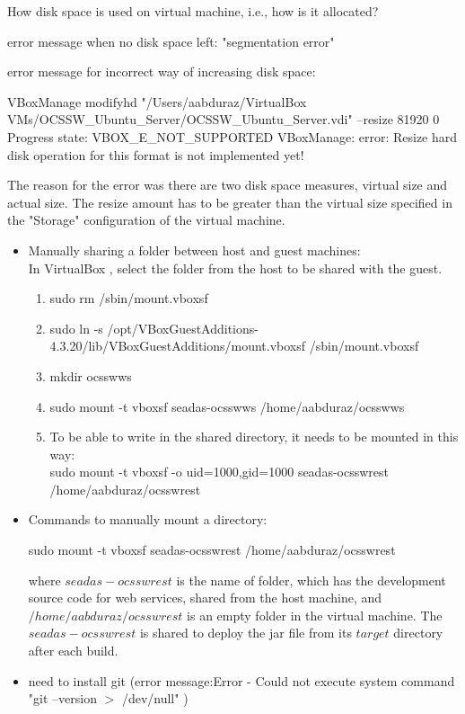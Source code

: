 \documentclass[11pt, oneside]{article}   	%
\begin{document}
How disk space is used on virtual machine, i.e., how is it allocated?

error message when no disk space left:
"segmentation error"

error message for incorrect way of increasing disk space:

VBoxManage modifyhd "/Users/aabduraz/VirtualBox VMs/OCSSW_Ubuntu_Server/OCSSW_Ubuntu_Server.vdi" --resize 81920
0%
Progress state: VBOX_E_NOT_SUPPORTED
VBoxManage: error: Resize hard disk operation for this format is not implemented yet!

The reason for the error was there are two disk space measures, virtual size and actual size. The resize amount has to be greater than the virtual size specified in the "Storage" configuration of the virtual machine.

\begin{itemize}

\item Manually sharing a folder between host and guest machines: \\
In VirtualBox {\color{blue}{\bf Devices  $\rightarrow $  Shared Folder Settings...  $\rightarrow $ Shared Folders  $\rightarrow $  Machine Folders}}, select the folder from the host to be shared with the guest.
   \begin{enumerate}
      \item sudo rm /sbin/mount.vboxsf
      \item sudo ln -s /opt/VBoxGuestAdditions-4.3.20/lib/VBoxGuestAdditions/mount.vboxsf /sbin/mount.vboxsf
      \item mkdir ocsswws
      \item sudo mount -t vboxsf seadas-ocsswws /home/aabduraz/ocsswws
      \item To be able to write in the shared directory, it needs to be mounted in this way:\\
      sudo mount -t vboxsf -o uid=1000,gid=1000 seadas-ocsswrest /home/aabduraz/ocsswrest

   \end{enumerate}

\item Commands to manually mount a directory:
\begin{code}
sudo mount -t vboxsf seadas-ocsswrest /home/aabduraz/ocsswrest
\end{code}
where $seadas-ocsswrest$ is the name of folder, which has the development source code for web services, shared from the host machine, and $/home/aabduraz/ocsswrest$ is an empty folder in the virtual machine. The  $seadas-ocsswrest$ is shared to deploy the jar file from its $target$ directory after each build. 

\item need to install git
(error message:Error - Could not execute system command "git --version $>$ /dev/null" )

\end{itemize}
\end{document}
